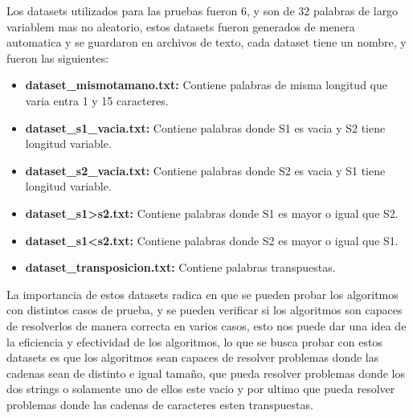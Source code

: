 Los datasets utilizados para las pruebas fueron 6, y son de 32 palabras de largo variablem mas no aleatorio, estos datasets
fueron generados de menera automatica y se guardaron en archivos de texto, cada dataset tiene un nombre, y fueron las siguientes:
\begin{itemize}
    \item \textbf{dataset\_mismotamano.txt:} Contiene palabras de misma longitud que varia entra 1 y 15 caracteres.
    \item \textbf{dataset\_s1\_vacia.txt:} Contiene palabras donde S1 es vacia y S2 tiene longitud variable.
    \item \textbf{dataset\_s2\_vacia.txt:} Contiene palabras donde S2 es vacia y S1 tiene longitud variable.
    \item \textbf{dataset\_s1>s2.txt:} Contiene palabras donde S1 es mayor o igual que S2.
    \item \textbf{dataset\_s1<s2.txt:} Contiene palabras donde S2 es mayor o igual que S1.
    \item \textbf{dataset\_transposicion.txt:} Contiene palabras transpuestas.
\end{itemize}

La importancia de estos datasets radica en que se pueden probar los algoritmos con distintos casos de prueba, y se pueden
verificar si los algoritmos son capaces de resolverlos de manera correcta en varios casos, esto nos puede dar una idea de
la eficiencia y efectividad de los algoritmos, lo que se busca probar con estos datasets es que los algoritmos sean capaces
de resolver problemas donde las cadenas sean de distinto e igual tamaño, que pueda resolver problemas donde los dos strings o solamente
uno de ellos este vacio y por ultimo que pueda resolver problemas donde las cadenas de caracteres esten transpuestas.